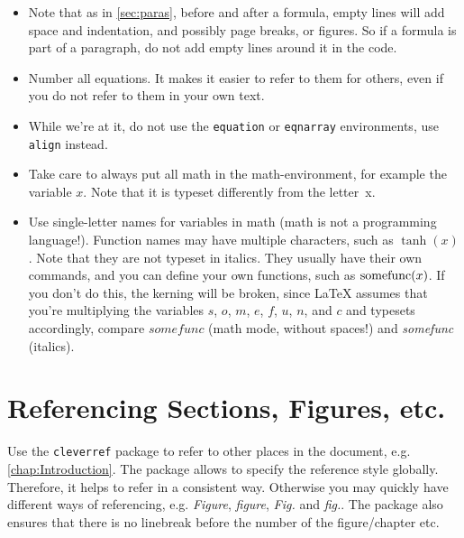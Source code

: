 \documentclass[{{cookiecutter.project_slug}}.tex]{subfiles}
\begin{document}
    \begin{itemize}
        \item
    Note that  as in \cref{sec:paras},  before and after a  formula, empty 
    lines will  add space  and indentation, and  possibly page  breaks, or 
    figures.  So  if a formula  is part of a  paragraph, do not  add empty 
    lines around it in the code.                                           

        \item
    Number all equations.  It makes it  easier to refer to them for others,
    even if you do not refer to them in your own text.

        \item
    While we're at  it, do not use the  \verb+equation+ or \verb+eqnarray+ 
    environments, use \verb+align+ instead.

        \item
    Take care to always put all  math in the math-environment, for example 
    the  variable $x$.   Note  that  it is  typeset  differently from  the 
    letter~x.

        \item
    Use  single-letter  names  for  variables   in  math  (math  is  not  a
    programming language!).   Function names  may have  multiple characters,
    such as $\tanh(x)$.  Note that they are not typeset in italics.  
    They  usually have  their own  commands, and  you can  define your  own
    functions, such as  $\operatorname*{somefunc}(x)$.  If you don't do  this, the kerning
    will  be broken,  since \LaTeX{}  assumes that  you're multiplying  the
    variables  $s$, $o$,  $m$, $e$,  $f$, $u$,  $n$, and  $c$ and  typesets
    accordingly,  compare  $somefunc$  (math  mode,  without  spaces!)  and
    \emph{somefunc} (italics).

    \end{itemize}

    \section{Referencing Sections, Figures, etc.}
    Use  the \verb+cleverref+  package to  refer  to other  places in  the 
    document,  e.g.  \cref{chap:Introduction}.    The  package  allows  to 
    specify the reference style globally.  Therefore, it helps to refer in 
    a consistent  way.  Otherwise you  may quickly have different  ways of 
    referencing,   e.g.  \emph{Figure},   \emph{figure},  \emph{Fig.}   and
    \emph{fig.}.   The package  also ensures  that there  is no  linebreak 
    before the number of the figure/chapter etc.                           
\end{document}
